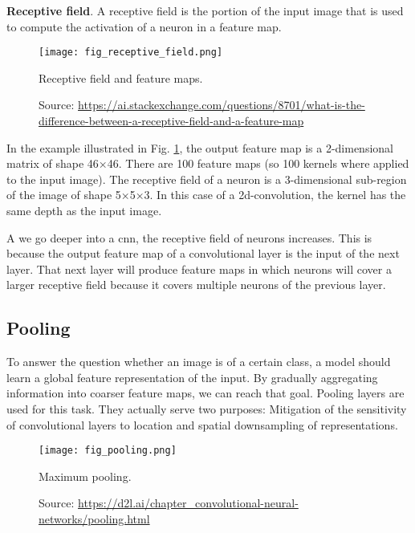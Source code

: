 \textbf{Receptive field}. A receptive field is the portion of the input image that is used to compute the activation of a neuron in a feature map.

\begin{figure}[ht]
    \begin{center}       
    \texttt{[image: fig\_receptive\_field.png]}
    \caption[Receptive field and feature maps]{Receptive field and feature maps.}
    \caption*{Source: \href{https://ai.stackexchange.com/questions/8701/what-is-the-difference-between-a-receptive-field-and-a-feature-map}{https://ai.stackexchange.com/questions/8701/what-is-the-difference-between-a-receptive-field-and-a-feature-map}}
    \label{fig:receptive_field}
    \end{center}
\end{figure}

In the example illustrated in Fig. \ref{fig:receptive_field}, the output feature map is a 2-dimensional matrix of shape 46×46. There are 100 feature maps (so 100 kernels where applied to the input image). The receptive field of a neuron is a 3-dimensional sub-region of the image of shape 5×5×3. In this case of a 2d-convolution, the kernel has the same depth as the input image.

A we go deeper into a \acrshort{cnn}, the receptive field of neurons increases. This is because the output feature map of a convolutional layer is the input of the next layer. That next layer will produce feature maps in which neurons will cover a larger receptive field because it covers multiple neurons of the previous layer.

\subsection{Pooling}
To answer the question whether an image is of a certain class, a model should learn a global feature representation of the input. By gradually aggregating information into coarser feature maps, we can reach that goal. Pooling layers are used for this task. They actually serve two purposes: Mitigation of the sensitivity of convolutional layers to location and spatial downsampling of representations.

\begin{figure}[ht]
    \begin{center}       
    \texttt{[image: fig\_pooling.png]}
    \caption[Maximum pooling]{Maximum pooling.}
    \caption*{Source: \href{https://d2l.ai/chapter\_convolutional-neural-networks/pooling.html}{https://d2l.ai/chapter\_convolutional-neural-networks/pooling.html}}
    \label{fig:pooling}
    \end{center}
\end{figure}

